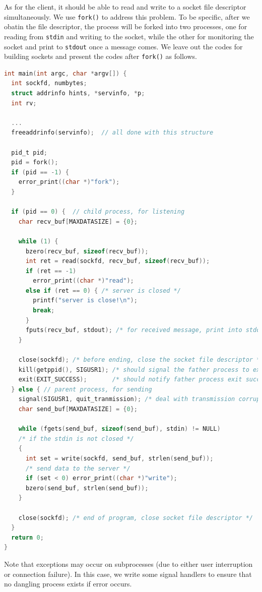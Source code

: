 \begin{exercise}[]
  As for the client, it should be able to read and write to a socket file descriptor simultaneously. We use \texttt{fork()} to address this problem. To be specific, after we obatin the file descriptor, the process will be forked into two processes, one for reading from \texttt{stdin} and writing to the socket, while the other for monitoring the socket and print to \texttt{stdout} once a message comes. We leave out the codes for building sockets and present the codes after \texttt{fork()} as follows.

\begin{lstlisting}[language=C]
int main(int argc, char *argv[]) {
  int sockfd, numbytes;
  struct addrinfo hints, *servinfo, *p;
  int rv;

  ...
  freeaddrinfo(servinfo);  // all done with this structure

  pid_t pid;
  pid = fork();
  if (pid == -1) {
    error_print((char *)"fork");
  }

  if (pid == 0) {  // child process, for listening
    char recv_buf[MAXDATASIZE] = {0};

    while (1) {
      bzero(recv_buf, sizeof(recv_buf));
      int ret = read(sockfd, recv_buf, sizeof(recv_buf));
      if (ret == -1)
        error_print((char *)"read");
      else if (ret == 0) { /* server is closed */
        printf("server is close!\n");
        break;
      }
      fputs(recv_buf, stdout); /* for received message, print into stdout */
    }

    close(sockfd); /* before ending, close the socket file descriptor */
    kill(getppid(), SIGUSR1); /* should signal the father process to exit */
    exit(EXIT_SUCCESS);       /* should notify father process exit success */
  } else { // parent process, for sending
    signal(SIGUSR1, quit_tranmission); /* deal with transmission corruption */
    char send_buf[MAXDATASIZE] = {0};

    while (fgets(send_buf, sizeof(send_buf), stdin) != NULL)
    /* if the stdin is not closed */
    {
      int set = write(sockfd, send_buf, strlen(send_buf));
      /* send data to the server */
      if (set < 0) error_print((char *)"write");
      bzero(send_buf, strlen(send_buf));
    }

    close(sockfd); /* end of program, close socket file descriptor */
  }
  return 0;
}
\end{lstlisting}

Note that exceptions may occur on subprocesses (due to either user interruption or connection failure). In this case, we write some signal handlers to ensure that no dangling process exists if error occurs.


\end{exercise}

